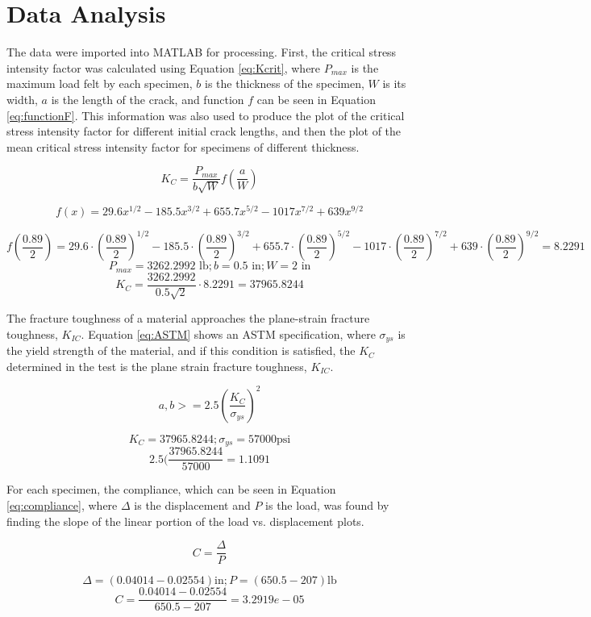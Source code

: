 \section{Data Analysis}

The data were imported into MATLAB for processing. First, the critical stress intensity factor was calculated using Equation \ref{eq:Kcrit}, where $P_{max}$ is the maximum load felt by each specimen, $b$ is the thickness of the specimen, $W$ is its width, $a$ is the length of the crack, and function $f$ can be seen in Equation \ref{eq:functionF}. This information was also used to produce the plot of the critical stress intensity factor for different initial crack lengths, and then the plot of the mean critical stress intensity factor for specimens of different thickness.

\begin{equation} \label{eq:Kcrit}
K_C = \frac{P_{max}}{b\sqrt{W}}f(\frac{a}{W})
\end{equation}

\begin{equation} \label{eq:functionF}
f(x) = 29.6x^{1/2} - 185.5x^{3/2} + 655.7x^{5/2} - 1017x^{7/2} + 639x^{9/2}
\end{equation}

\begin{exmp}
$$f(\frac{0.89}{2}) = 29.6\cdot (\frac{0.89}{2})^{1/2} - 185.5\cdot (\frac{0.89}{2})^{3/2} + 655.7\cdot (\frac{0.89}{2})^{5/2} - 1017\cdot (\frac{0.89}{2})^{7/2} + 639\cdot (\frac{0.89}{2})^{9/2} = 8.2291$$
$$P_{max} = 3262.2992 \text{ lb}; b = 0.5 \text{ in}; W = 2 \text{ in}$$
$$K_C = \frac{3262.2992}{0.5\sqrt{2}}\cdot 8.2291 = 37965.8244$$
\end{exmp}

The fracture toughness of a material approaches the plane-strain fracture toughness, $K_{IC}$. Equation \ref{eq:ASTM} shows an ASTM specification, where $\sigma_{ys}$ is the yield strength of the material, and if this condition is satisfied, the $K_C$ determined in the test is the plane strain fracture toughness, $K_{IC}$.

\begin{equation} \label{eq:ASTM}
a, b >= 2.5(\frac{K_C}{\sigma_{ys}})^2
\end{equation}

\begin{exmp}
$$K_C = 37965.8244; \sigma_{ys} = 57000 \text{psi}$$
$$2.5(\frac{37965.8244}{57000} = 1.1091$$
\end{exmp}

For each specimen, the compliance, which can be seen in Equation \ref{eq:compliance}, where $\Delta$ is the displacement and $P$ is the load, was found by finding the slope of the linear portion of the load vs. displacement plots.

\begin{equation} \label{eq:compliance}
C = \frac{\Delta}{P}
\end{equation}

\begin{exmp}
$$\Delta = (0.04014 - 0.02554) \text{in}; P = (650.5 - 207) \text{lb}$$
$$C = \frac{0.04014 - 0.02554}{650.5-207} = 3.2919e-05$$
\end{exmp}